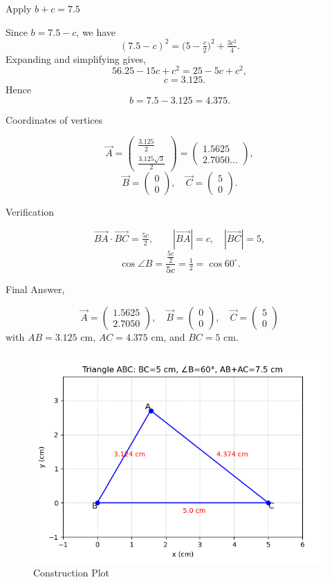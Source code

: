 \documentclass[journal]{IEEEtran}
\begin{document}
  Apply $b+c=7.5$

Since $b=7.5-c$, we have
\[
(7.5-c)^2 = \Big(5-\tfrac{c}{2}\Big)^2 + \tfrac{3c^2}{4}.
\]
Expanding and simplifying gives,
\[
56.25 -15c + c^2 = 25 -5c + c^2,
\]
\[
\quad c=3.125.
\]
Hence
\[
b = 7.5 - 3.125 = 4.375.
\]

 Coordinates of vertices

\[
\vec{A} = \begin{pmatrix}\tfrac{3.125}{2}\\[4pt]\tfrac{3.125\sqrt{3}}{2}\end{pmatrix}
= \begin{pmatrix}1.5625\\[4pt]2.7050\ldots\end{pmatrix},
\]
\[
\vec{B}=\begin{pmatrix}0\\0\end{pmatrix}, \quad
\vec{C}=\begin{pmatrix}5\\0\end{pmatrix}.
\]

Verification

\[
\vec{BA}\cdot \vec{BC} = \tfrac{5c}{2}, \qquad
|\vec{BA}|=c, \quad |\vec{BC}|=5,
\]
\[
\cos \angle B = \frac{\tfrac{5c}{2}}{5c} = \tfrac{1}{2} = \cos 60^\circ.
\]

Final Answer,

\[
\boxed{
\vec{A} = \begin{pmatrix}1.5625\\[4pt]2.7050\end{pmatrix},\quad
\vec{B} = \begin{pmatrix}0\\0\end{pmatrix},\quad
\vec{C} = \begin{pmatrix}5\\0\end{pmatrix}
}
\]
with $AB=3.125$ cm, $AC=4.375$ cm, and $BC=5$ cm.\\


\begin{figure}[H]
    \centering
    \includegraphics[width=1.0\linewidth]{figs/image.png}
    \caption{Construction Plot}
    \label{fig:placeholder}
\end{figure}
\end{document}
